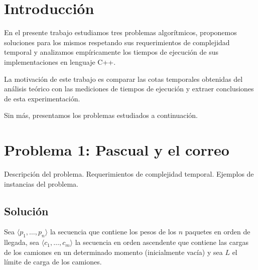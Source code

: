 \documentclass[a4paper,10pt,twoside]{article}
\begin{document}
\newpage




\tableofcontents

\newpage




\section{Introducción}

En el presente trabajo estudiamos tres problemas algorítmicos, proponemos soluciones para los mismos respetando sus requerimientos de complejidad temporal y analizamos empíricamente los tiempos de ejecución de sus implementaciones en lenguaje C++.

La motivación de este trabajo es comparar las cotas temporales obtenidas del análisis teórico con las mediciones de tiempos de ejecución y extraer conclusiones de esta experimentación.

Sin más, presentamos los problemas estudiados a continuación.




\section{Problema 1: Pascual y el correo}

Descripción del problema. Requerimientos de complejidad temporal. Ejemplos de instancias del problema.


\subsection{Solución}

Sea $\langle p_1, \ldots, p_n \rangle$ la secuencia que contiene los pesos de los $n$ paquetes en orden de llegada, sea $\langle c_1, \ldots, c_m \rangle$ la secuencia en orden ascendente que contiene las cargas de los camiones en un determinado momento (inicialmente vacía) y sea $L$ el límite de carga de los camiones.
\end{document}
